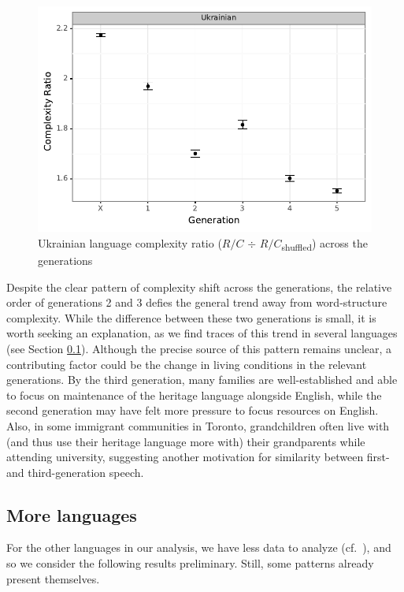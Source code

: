 \documentclass[output=paper]{langscibook}
\begin{document}
\begin{figure}
\includegraphics[width=\linewidth]{figures/UKR_ggplot_FW_complexity.pdf}
\caption{Ukrainian language complexity ratio ($R/C$ $\div$   $R/C$\textsubscript{shuffled}) across the generations}
\label{ukr_complexity}
\end{figure}

Despite the clear pattern of complexity shift across the generations, the relative order of generations 2 and 3 defies the general trend away from word-structure complexity. While the difference between these two generations is small, it is worth seeking an explanation, as we find traces of this trend in several languages (see Section \ref{more-languages}). Although the precise source of this pattern remains unclear, a contributing factor could be the change in living conditions in the relevant generations. By the third generation, many families are well-established and able to focus on maintenance of the heritage language alongside English, while the second generation may have felt more pressure to focus resources on English. Also, in some immigrant communities in Toronto, grandchildren often live with (and thus use their heritage language more with) their grandparents while attending university, suggesting another motivation for similarity between first- and third-generation speech.    


\subsection{More languages} \label{more-languages}

For the other languages in our analysis, we have less data to analyze (cf.~), and so we consider the following results preliminary. Still, some patterns already present themselves. 
\end{document}
